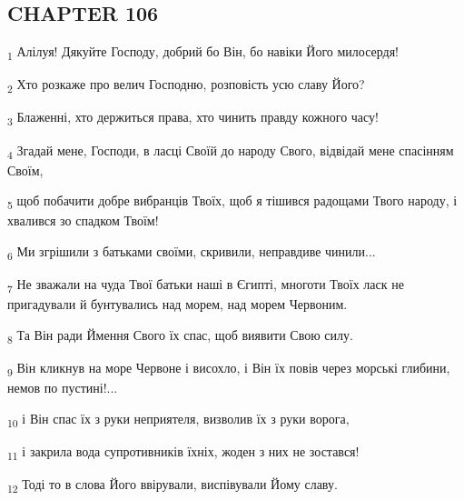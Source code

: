 \subsection{CHAPTER 106}
\begin{tcolorbox}
\textsubscript{1} Алілуя! Дякуйте Господу, добрий бо Він, бо навіки Його милосердя!
\end{tcolorbox}
\begin{tcolorbox}
\textsubscript{2} Хто розкаже про велич Господню, розповість усю славу Його?
\end{tcolorbox}
\begin{tcolorbox}
\textsubscript{3} Блаженні, хто держиться права, хто чинить правду кожного часу!
\end{tcolorbox}
\begin{tcolorbox}
\textsubscript{4} Згадай мене, Господи, в ласці Своїй до народу Свого, відвідай мене спасінням Своїм,
\end{tcolorbox}
\begin{tcolorbox}
\textsubscript{5} щоб побачити добре вибранців Твоїх, щоб я тішився радощами Твого народу, і хвалився зо спадком Твоїм!
\end{tcolorbox}
\begin{tcolorbox}
\textsubscript{6} Ми згрішили з батьками своїми, скривили, неправдиве чинили...
\end{tcolorbox}
\begin{tcolorbox}
\textsubscript{7} Не зважали на чуда Твої батьки наші в Єгипті, многоти Твоїх ласк не пригадували й бунтувались над морем, над морем Червоним.
\end{tcolorbox}
\begin{tcolorbox}
\textsubscript{8} Та Він ради Ймення Свого їх спас, щоб виявити Свою силу.
\end{tcolorbox}
\begin{tcolorbox}
\textsubscript{9} Він кликнув на море Червоне і висохло, і Він їх повів через морські глибини, немов по пустині!...
\end{tcolorbox}
\begin{tcolorbox}
\textsubscript{10} і Він спас їх з руки неприятеля, визволив їх з руки ворога,
\end{tcolorbox}
\begin{tcolorbox}
\textsubscript{11} і закрила вода супротивників їхніх, жоден з них не зостався!
\end{tcolorbox}
\begin{tcolorbox}
\textsubscript{12} Тоді то в слова Його ввірували, виспівували Йому славу.
\end{tcolorbox}
